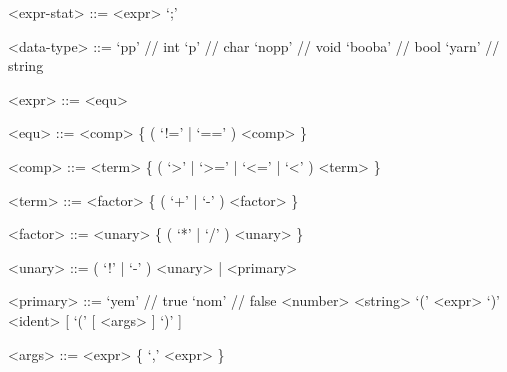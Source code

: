 \documentclass[12pt, a4paper]{article}
\begin{document}
\begin{grammar}
        <expr-stat> ::= <expr> `;'

        <data-type> ::= `pp' // int
        \alt `p' // char
        \alt `nopp' // void
        \alt `booba' // bool
        \alt `yarn' // string

        <expr> ::= <equ>

        <equ> ::= <comp> \{ ( `!=' | `==' ) <comp> \}

        <comp> ::= <term> \{ ( `>' | `>=' | `<=' | `<' ) <term> \}

        <term> ::= <factor> \{ ( `+' | `-' ) <factor> \}

        <factor> ::= <unary> \{ ( `*' | `/' ) <unary> \}

        <unary> ::= ( `!' | `-' ) <unary> | <primary>

        <primary> ::= `yem' // true
        \alt `nom' // false
        \alt <number>
        \alt <string>
        \alt `(' <expr> `)'
        \alt <ident> [ `(' [ <args> ] `)' ]

        <args> ::= <expr> \{ `,' <expr> \}
    \end{grammar}
\end{document}
